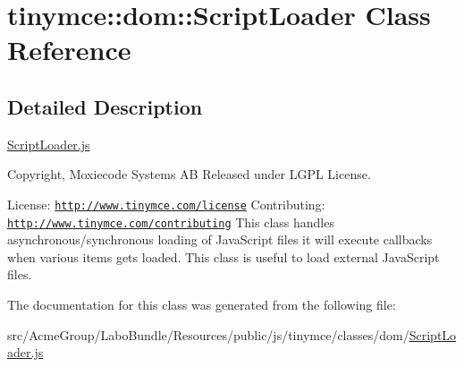 \hypertarget{classtinymce_1_1dom_1_1_script_loader}{\section{tinymce\+:\+:dom\+:\+:Script\+Loader Class Reference}
\label{classtinymce_1_1dom_1_1_script_loader}
}


\subsection{Detailed Description}
\hyperlink{_script_loader_8js}{Script\+Loader.\+js}

Copyright, Moxiecode Systems A\+B Released under L\+G\+P\+L License.

License\+: \href{http://www.tinymce.com/license}{\tt http\+://www.\+tinymce.\+com/license} Contributing\+: \href{http://www.tinymce.com/contributing}{\tt http\+://www.\+tinymce.\+com/contributing} This class handles asynchronous/synchronous loading of Java\+Script files it will execute callbacks when various items gets loaded. This class is useful to load external Java\+Script files. 

The documentation for this class was generated from the following file\+:\begin{DoxyCompactItemize}
\item 
src/\+Acme\+Group/\+Labo\+Bundle/\+Resources/public/js/tinymce/classes/dom/\hyperlink{_script_loader_8js}{Script\+Loader.\+js}\end{DoxyCompactItemize}
